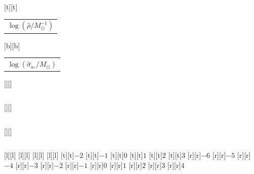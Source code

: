 %    
%
%
\begin{psfrags}%
\psfragscanon%
%
[t][t]{\color[rgb]{0,0,0}\setlength{\tabcolsep}{0pt}\begin{tabular}{c}{\Large$\log\left(\hat{\rho}/M_\odot^{-1}\right)$}\end{tabular}}%
[b][b]{\color[rgb]{0,0,0}\setlength{\tabcolsep}{0pt}\begin{tabular}{c}{\Large$\log\left(\hat{\sigma}_{a_\ast}/M_\odot\right)$}\end{tabular}}%
[][]{\color[rgb]{0,0,0}\setlength{\tabcolsep}{0pt}\begin{tabular}{c} \end{tabular}}%
[][]{\color[rgb]{0,0,0}\setlength{\tabcolsep}{0pt}\begin{tabular}{c} \end{tabular}}%
[][]{\color[rgb]{0,0,0}\setlength{\tabcolsep}{0pt}\begin{tabular}{c} \end{tabular}}%
[l][l]{\color[rgb]{0,0,0}{\large$a_\ast = 0.0$}}%
[l][l]{\color[rgb]{0,0,0}{\large$a_\ast = 0.3$}}%
[l][l]{\color[rgb]{0,0,0}{\large$a_\ast = 0.6$}}%
[l][l]{\color[rgb]{0,0,0}{\large$a_\ast = 0.9$}}%
%
[t][t]{$-2$}%
[t][t]{$-1$}%
[t][t]{$0$}%
[t][t]{$1$}%
[t][t]{$2$}%
[t][t]{$3$}%
%
[r][r]{$-6$}%
[r][r]{$-5$}%
[r][r]{$-4$}%
[r][r]{$-3$}%
[r][r]{$-2$}%
[r][r]{$-1$}%
[r][r]{$0$}%
[r][r]{$1$}%
[r][r]{$2$}%
[r][r]{$3$}%
[r][r]{$4$}%
%
%
\end{psfrags}%
%
